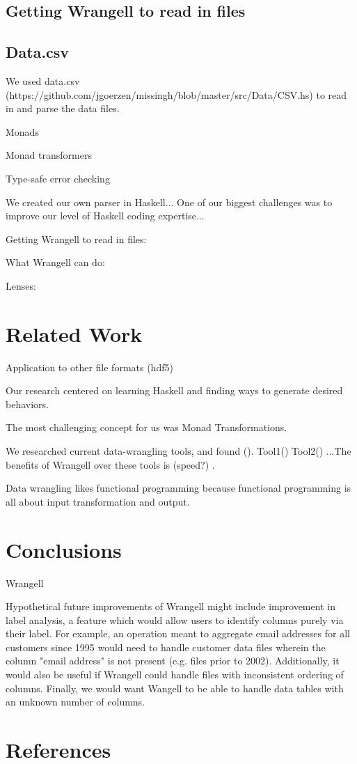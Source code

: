 \documentclass[preprint,nocopyrightspace]{sig-alternate}
\begin{document}
\subsection{Getting Wrangell to read in files}

\subsection{Data.csv} 



We used data.csv (https://github.com/jgoerzen/missingh/blob/master/src/Data/CSV.hs) to read in and parse the data files. 

Monads 

Monad transformers


Type-safe error checking


We created our own parser in Haskell... 
One of our biggest challenges was to improve our level of Haskell coding expertise...

Getting Wrangell to read in files:

What Wrangell can do:


Lenses: 

\section{Related Work}


Application to other file formats (hdf5)

Our research centered on learning Haskell and finding ways to generate desired behaviors. 

The most challenging concept for us was Monad Transformations. 
 


We researched current data-wrangling tools, and found ().
Tool1()
Tool2()
...The benefits of Wrangell over these tools is (speed?) . 


Data wrangling likes functional programming because functional programming is all about input transformation and output. 

\section{Conclusions}
Wrangell 


Hypothetical future improvements of Wrangell might include improvement in label analysis, a feature which would allow users to identify columns purely via their label. For example, an operation meant to aggregate email addresses for all customers since 1995 would need to handle customer data files wherein the column "email address" is not present (e.g. files prior to 2002). Additionally, it would also be useful if Wrangell could handle files with inconsistent ordering of columns. Finally, we would want Wangell to be able to handle data tables with an unknown number of columns. 


\section{References}
\end{document}
